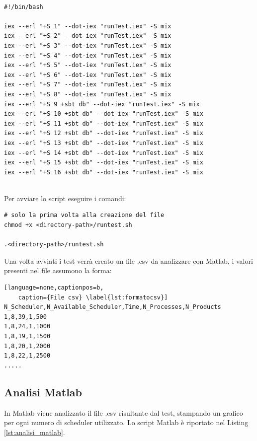 \begin{lstlisting}[language=none,captionpos=b,
	caption={Script bash per l'avvio dei test},
	label={lst:script_bash}]

#!/bin/bash

iex --erl "+S 1" --dot-iex "runTest.iex" -S mix
iex --erl "+S 2" --dot-iex "runTest.iex" -S mix
iex --erl "+S 3" --dot-iex "runTest.iex" -S mix
iex --erl "+S 4" --dot-iex "runTest.iex" -S mix
iex --erl "+S 5" --dot-iex "runTest.iex" -S mix
iex --erl "+S 6" --dot-iex "runTest.iex" -S mix
iex --erl "+S 7" --dot-iex "runTest.iex" -S mix
iex --erl "+S 8" --dot-iex "runTest.iex" -S mix
iex --erl "+S 9 +sbt db" --dot-iex "runTest.iex" -S mix
iex --erl "+S 10 +sbt db" --dot-iex "runTest.iex" -S mix
iex --erl "+S 11 +sbt db" --dot-iex "runTest.iex" -S mix
iex --erl "+S 12 +sbt db" --dot-iex "runTest.iex" -S mix
iex --erl "+S 13 +sbt db" --dot-iex "runTest.iex" -S mix
iex --erl "+S 14 +sbt db" --dot-iex "runTest.iex" -S mix
iex --erl "+S 15 +sbt db" --dot-iex "runTest.iex" -S mix
iex --erl "+S 16 +sbt db" --dot-iex "runTest.iex" -S mix
	
\end{lstlisting}

Per avviare lo script eseguire i comandi:
\begin{lstlisting}[language=none]
# solo la prima volta alla creazione del file
chmod +x <directory-path>/runtest.sh 

.<directory-path>/runtest.sh
\end{lstlisting}

Una volta avviati i test verrà creato un file .csv da
analizzare con Matlab, i valori presenti nel file
assumono la forma:

\begin{lstlisting}[language=none,captionpos=b,
	caption={File csv} \label{lst:formatocsv}]
N_Scheduler,N_Available_Scheduler,Time,N_Processes,N_Products
1,8,39,1,500
1,8,24,1,1000
1,8,19,1,1500
1,8,20,1,2000
1,8,22,1,2500
.....
\end{lstlisting}


\subsection{Analisi Matlab}

In Matlab viene analizzato il file .csv risultante dal
test, stampando un grafico per ogni numero di scheduler utilizzato.
Lo script Matlab è riportato nel Listing \ref{lst:analisi_matlab}.

